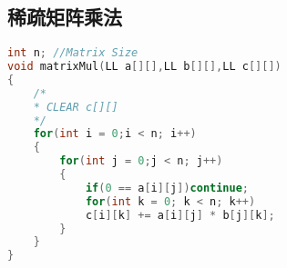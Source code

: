 ﻿\subsection{稀疏矩阵乘法}
    \begin{lstlisting}[language=C++]
int n; //Matrix Size
void matrixMul(LL a[][],LL b[][],LL c[][])
{
	/*
	* CLEAR c[][]
	*/
    for(int i = 0;i < n; i++)
    {
        for(int j = 0;j < n; j++)
        {
            if(0 == a[i][j])continue;
            for(int k = 0; k < n; k++)
            c[i][k] += a[i][j] * b[j][k];
        }
    }
}
    \end{lstlisting}
